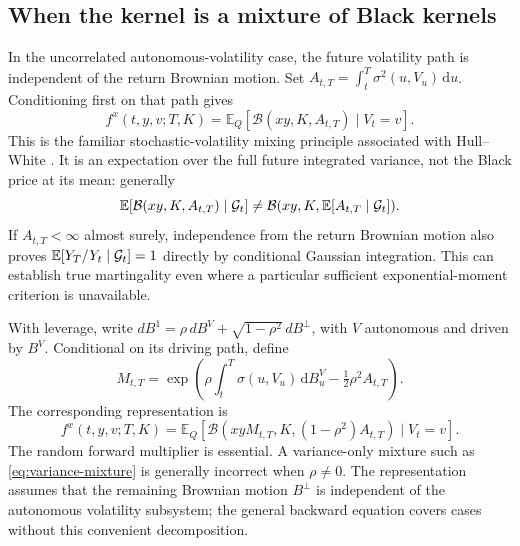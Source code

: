 \documentclass[11pt,a4paper]{article}
\numberwithin{equation}{section}
\theoremstyle{definition}\newtheorem{definition}[theorem]{Definition}
\theoremstyle{remark}\newtheorem{remark}[theorem]{Remark}
\newcommand{\E}{\mathbb E}\newcommand{\R}{\mathbb R}
\newcommand{\dd}{\,\mathrm d}\newcommand{\dt}{\,\mathrm dt}
\newcommand{\Black}{\mathcal B}\newcommand{\LC}{\mathcal L}
\begin{document}
\subsection{When the kernel is a mixture of Black kernels}
In the uncorrelated autonomous-volatility case, the future volatility path is independent of the return Brownian motion. Set $A_{t,T}=\int_t^T\sigma^2(u,V_u)\dd u$. Conditioning first on that path gives
\begin{equation}
 f^x(t,y,v;T,K)=\E_Q[\Black(xy,K,A_{t,T})\mid V_t=v].
 \label{eq:variance-mixture}
\end{equation}
This is the familiar stochastic-volatility mixing principle associated with Hull--White \cite{HullWhite1987}. It is an expectation over the full future integrated variance, not the Black price at its mean: generally
\[
 \E[\Black(xy,K,A_{t,T})\mid\G_t]
 \ne\Black(xy,K,\E[A_{t,T}\mid\G_t]).
\]
If $A_{t,T}<\infty$ almost surely, independence from the return Brownian motion also proves $\E[Y_T/Y_t\mid\G_t]=1$ directly by conditional Gaussian integration. This can establish true martingality even where a particular sufficient exponential-moment criterion is unavailable.

With leverage, write $dB^1=\rho\,dB^V+\sqrt{1-\rho^2}\,dB^\perp$, with $V$ autonomous and driven by $B^V$. Conditional on its driving path, define
\[
 M_{t,T}=\exp\left(\rho\int_t^T\sigma(u,V_u)\dd B_u^V
                  -\tfrac12\rho^2 A_{t,T}\right).
\]
The corresponding representation is
\begin{equation}
 f^x(t,y,v;T,K)
 =\E_Q[\Black(xyM_{t,T},K,(1-\rho^2)A_{t,T})\mid V_t=v].
 \label{eq:leveraged-mixture}
\end{equation}
The random forward multiplier is essential. A variance-only mixture such as \eqref{eq:variance-mixture} is generally incorrect when $\rho\ne0$. The representation assumes that the remaining Brownian motion $B^\perp$ is independent of the autonomous volatility subsystem; the general backward equation covers cases without this convenient decomposition.
\end{document}
